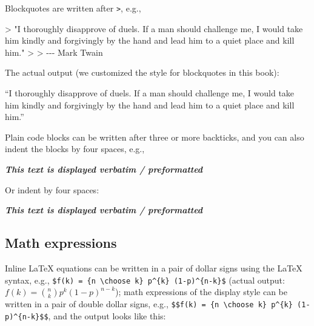 \documentclass[
  12pt,
]{krantz}
\newenvironment{Shaded}{\begin{snugshade}}{\end{snugshade}}
\newcommand{\AttributeTok}[1]{\textcolor[rgb]{0.77,0.63,0.00}{#1}}
\newcommand{\InformationTok}[1]{\textcolor[rgb]{0.56,0.35,0.01}{\textbf{\textit{#1}}}}
\newcommand{\NormalTok}[1]{#1}
\renewenvironment{quote}{\begin{VF}}{\end{VF}}
\theoremstyle{definition}
\theoremstyle{definition}
\theoremstyle{definition}
\theoremstyle{definition}
\theoremstyle{remark}
\begin{document}
Blockquotes are written after \texttt{\textgreater{}}, e.g.,

\begin{Shaded}
\begin{Highlighting}[]
\AttributeTok{\textgreater{} "I thoroughly disapprove of duels. If a man should challenge me,}
\AttributeTok{  I would take him kindly and forgivingly by the hand and lead him}
\AttributeTok{  to a quiet place and kill him."}
\AttributeTok{\textgreater{}}
\AttributeTok{\textgreater{} {-}{-}{-} Mark Twain}
\end{Highlighting}
\end{Shaded}

The actual output (we customized the style for blockquotes in this book):

\begin{quote}
``I thoroughly disapprove of duels. If a man should challenge me,
I would take him kindly and forgivingly by the hand and lead him
to a quiet place and kill him.''

\end{quote}

Plain code blocks can be written after three or more backticks, and you can also indent the blocks by four spaces, e.g.,

\begin{Shaded}
\begin{Highlighting}[]
\InformationTok{\textasciigrave{}\textasciigrave{}\textasciigrave{}}
\InformationTok{This text is displayed verbatim / preformatted}
\InformationTok{\textasciigrave{}\textasciigrave{}\textasciigrave{}}

\NormalTok{Or indent by four spaces:}

\InformationTok{    This text is displayed verbatim / preformatted}
\end{Highlighting}
\end{Shaded}

\hypertarget{math-expressions}{%
\subsection{Math expressions}\label{math-expressions}}

Inline LaTeX equations can be written in a pair of dollar signs using the LaTeX syntax, e.g., \texttt{\$f(k)\ =\ \{n\ \textbackslash{}choose\ k\}\ p\^{}\{k\}\ (1-p)\^{}\{n-k\}\$} (actual output: \(f(k)={n \choose k}p^{k}(1-p)^{n-k}\)); math expressions of the display style can be written in a pair of double dollar signs, e.g., \texttt{\$\$f(k)\ =\ \{n\ \textbackslash{}choose\ k\}\ p\^{}\{k\}\ (1-p)\^{}\{n-k\}\$\$}, and the output looks like this:
\end{document}
